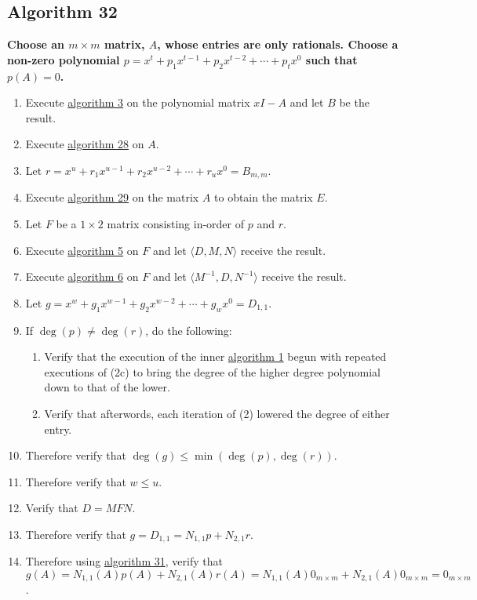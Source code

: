 \documentclass[twocolumn]{article}
\begin{document}
		\subsection{Algorithm 32}\label{sec:algorithm 32}
			\textbf{Choose an $m\times m$ matrix, $A$, whose entries are only rationals. Choose a non-zero polynomial $p=x^t+p_1x^{t-1}+p_2x^{t-2}+\cdots+p_tx^0$ such that $p(A)=0$.}
			\begin{enumerate}
				\item Execute \hyperref[sec:algorithm 3]{algorithm 3} on the polynomial matrix $xI-A$ and let $B$ be the result.
				\item Execute \hyperref[sec:algorithm 28]{algorithm 28} on $A$.
				\item Let $r=x^u+r_1x^{u-1}+r_2x^{u-2}+\cdots+r_ux^0=B_{m,m}$.
				\item Execute \hyperref[sec:algorithm 29]{algorithm 29} on the matrix $A$ to obtain the matrix $E$.
				\item Let $F$ be a $1\times 2$ matrix consisting in-order of $p$ and $r$.
				\item Execute \hyperref[sec:algorithm 5]{algorithm 5} on $F$ and let $\langle D,M,N\rangle$ receive the result.
				\item Execute \hyperref[sec:algorithm 6]{algorithm 6} on $F$ and let $\langle M^{-1},D,N^{-1}\rangle$ receive the result.
				\item Let $g=x^w+g_1x^{w-1}+g_2x^{w-2}+\cdots+g_wx^0=D_{1,1}$.
				\item If $\deg(p)\ne\deg(r)$, do the following:
				\begin{enumerate}
					\item Verify that the execution of the inner \hyperref[sec:algorithm 1]{algorithm 1} begun with repeated executions of (2c) to bring the degree of the higher degree polynomial down to that of the lower.
					\item Verify that afterwords, each iteration of (2) lowered the degree of either entry.
				\end{enumerate}
				\item Therefore verify that $\deg(g)\le\min(\deg(p),\deg(r))$.
				\item Therefore verify that $w\le u$.
				\item Verify that $D=MFN$.
				\item Therefore verify that $g=D_{1,1}=N_{1,1}p+N_{2,1}r$.
				\item Therefore using \hyperref[sec:algorithm 31]{algorithm 31}, verify that $g(A)=N_{1,1}(A)p(A)+N_{2,1}(A)r(A)=N_{1,1}(A)0_{m\times m}+N_{2,1}(A)0_{m\times m}=0_{m\times m}$.

\end{enumerate}
\end{document}
